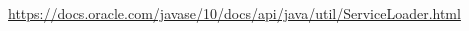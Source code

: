 \begin{thebibliography}{9}

\url{https://docs.oracle.com/javase/10/docs/api/java/util/ServiceLoader.html}

\end{thebibliography}